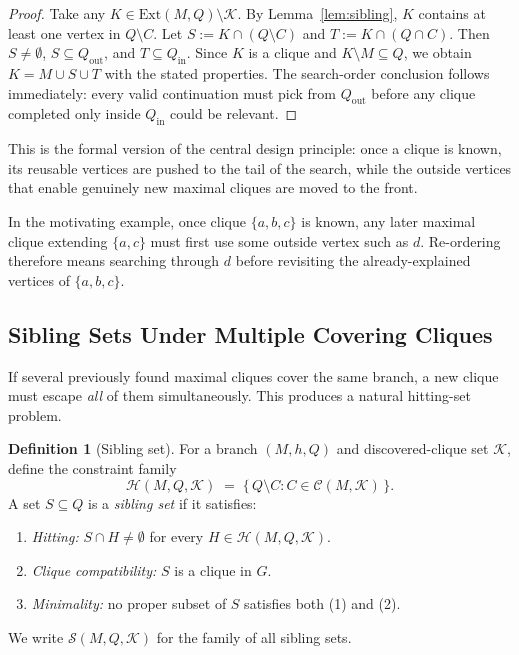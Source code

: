 \documentclass[sigconf, nonacm]{acmart}
\theoremstyle{definition}
\newtheorem{definition}[theorem]{Definition}
\theoremstyle{remark}
\begin{document}
\begin{proof}
Take any
$K \in \mathrm{Ext}(M,Q) \setminus \mathcal{K}$.  By
Lemma~\ref{lem:sibling}, $K$ contains at least one vertex in $Q \setminus C$.
Let
$S := K \cap (Q \setminus C)$ and $T := K \cap (Q \cap C)$.  Then
$S \ne \emptyset$, $S \subseteq Q_{\mathrm{out}}$, and
$T \subseteq Q_{\mathrm{in}}$.  Since $K$ is a clique and
$K \setminus M \subseteq Q$, we obtain
$K = M \cup S \cup T$ with the stated properties.  The search-order conclusion
follows immediately: every valid continuation must pick from $Q_{\mathrm{out}}$
before any clique completed only inside $Q_{\mathrm{in}}$ could be relevant.
\end{proof}

This is the formal version of the central design principle:
once a clique is known, its reusable vertices are pushed to the tail of the
search, while the outside vertices that enable genuinely new maximal cliques
are moved to the front.

In the motivating example, once clique $\{a,b,c\}$ is known, any later maximal
clique extending $\{a,c\}$ must first use some outside vertex such as $d$.
Re-ordering therefore means searching through $d$ before revisiting the
already-explained vertices of $\{a,b,c\}$.

\subsection{Sibling Sets Under Multiple Covering Cliques}

If several previously found maximal cliques cover the same branch, a new clique
must escape \emph{all} of them simultaneously.  This produces a natural
hitting-set problem.

\begin{definition}[Sibling set]\label{def:sibling}
For a branch $(M,h,Q)$ and discovered-clique set $\mathcal{K}$, define the
constraint family
\[
  \mathcal{H}(M,Q,\mathcal{K})
  \;=\;
  \bigl\{\, Q \setminus C : C \in \mathcal{C}(M,\mathcal{K}) \,\bigr\}.
\]
A set $S \subseteq Q$ is a \emph{sibling set} if it satisfies:
\begin{enumerate}
  \item \emph{Hitting:} $S \cap H \ne \emptyset$ for every
        $H \in \mathcal{H}(M,Q,\mathcal{K})$.
  \item \emph{Clique compatibility:} $S$ is a clique in $G$.
  \item \emph{Minimality:} no proper subset of $S$ satisfies both (1) and (2).
\end{enumerate}
We write $\mathcal{S}(M,Q,\mathcal{K})$ for the family of all sibling sets.
\end{definition}
\end{document}
